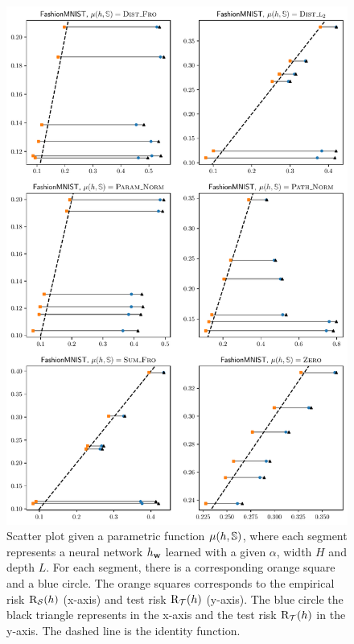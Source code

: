 \begin{figure}
    \centering
    \includegraphics[width=0.77\linewidth]{chapter_7/figures/gap_fashion.pdf}
    \caption[Tightness of  on FashionMNIST]{
    Scatter plot given a parametric function $\operatorname{\mu}(h, \mathbb{S})$, where each segment represents a neural network $h_{\mathbf{w}}$ learned with a given $\alpha$, width $H$ and depth $L$.
    For each segment, there is a corresponding orange square and a blue circle.
    The orange squares corresponds to the empirical risk $\text{R}_{\mathcal{S}}(h)$ (x-axis) and test risk $\text{R}_{\mathcal{T}}(h)$ (y-axis).
    The blue circle \resp the black triangle represents  \resp {} in the x-axis and the test risk $\text{R}_{\mathcal{T}}(h)$ in the y-axis.
    The dashed line is the identity function.
    }
    \label{chap:dis-mu:fig:gap-fashion}
\end{figure}

